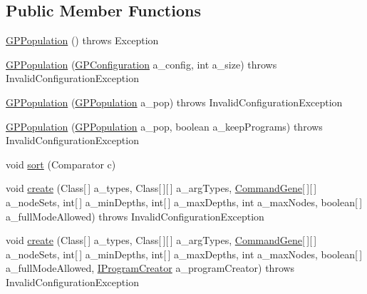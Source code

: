 \subsection*{Public Member Functions}
\begin{DoxyCompactItemize}
\item 
\hyperlink{classorg_1_1jgap_1_1gp_1_1impl_1_1_g_p_population_a2495394d8ede9583b5ac922b8149e37b}{G\-P\-Population} ()  throws Exception 
\item 
\hyperlink{classorg_1_1jgap_1_1gp_1_1impl_1_1_g_p_population_ad19b2b5571851230b86e6f1f0f74fe0b}{G\-P\-Population} (\hyperlink{classorg_1_1jgap_1_1gp_1_1impl_1_1_g_p_configuration}{G\-P\-Configuration} a\-\_\-config, int a\-\_\-size)  throws Invalid\-Configuration\-Exception 
\item 
\hyperlink{classorg_1_1jgap_1_1gp_1_1impl_1_1_g_p_population_a69cc3bdcc9e18685c208485f0c3d0a52}{G\-P\-Population} (\hyperlink{classorg_1_1jgap_1_1gp_1_1impl_1_1_g_p_population}{G\-P\-Population} a\-\_\-pop)  throws Invalid\-Configuration\-Exception 
\item 
\hyperlink{classorg_1_1jgap_1_1gp_1_1impl_1_1_g_p_population_a4dd4478edeca976efc6f31bcdafa19f0}{G\-P\-Population} (\hyperlink{classorg_1_1jgap_1_1gp_1_1impl_1_1_g_p_population}{G\-P\-Population} a\-\_\-pop, boolean a\-\_\-keep\-Programs)  throws Invalid\-Configuration\-Exception 
\item 
void \hyperlink{classorg_1_1jgap_1_1gp_1_1impl_1_1_g_p_population_a9d49b2b18535658aae05ecdc2263918b}{sort} (Comparator c)
\item 
void \hyperlink{classorg_1_1jgap_1_1gp_1_1impl_1_1_g_p_population_aeffef58a29ebb252060a7e2ed91227e2}{create} (Class\mbox{[}$\,$\mbox{]} a\-\_\-types, Class\mbox{[}$\,$\mbox{]}\mbox{[}$\,$\mbox{]} a\-\_\-arg\-Types, \hyperlink{classorg_1_1jgap_1_1gp_1_1_command_gene}{Command\-Gene}\mbox{[}$\,$\mbox{]}\mbox{[}$\,$\mbox{]} a\-\_\-node\-Sets, int\mbox{[}$\,$\mbox{]} a\-\_\-min\-Depths, int\mbox{[}$\,$\mbox{]} a\-\_\-max\-Depths, int a\-\_\-max\-Nodes, boolean\mbox{[}$\,$\mbox{]} a\-\_\-full\-Mode\-Allowed)  throws Invalid\-Configuration\-Exception 
\item 
void \hyperlink{classorg_1_1jgap_1_1gp_1_1impl_1_1_g_p_population_a0f3f874207800be662835fcbc58092cf}{create} (Class\mbox{[}$\,$\mbox{]} a\-\_\-types, Class\mbox{[}$\,$\mbox{]}\mbox{[}$\,$\mbox{]} a\-\_\-arg\-Types, \hyperlink{classorg_1_1jgap_1_1gp_1_1_command_gene}{Command\-Gene}\mbox{[}$\,$\mbox{]}\mbox{[}$\,$\mbox{]} a\-\_\-node\-Sets, int\mbox{[}$\,$\mbox{]} a\-\_\-min\-Depths, int\mbox{[}$\,$\mbox{]} a\-\_\-max\-Depths, int a\-\_\-max\-Nodes, boolean\mbox{[}$\,$\mbox{]} a\-\_\-full\-Mode\-Allowed, \hyperlink{interfaceorg_1_1jgap_1_1gp_1_1_i_program_creator}{I\-Program\-Creator} a\-\_\-program\-Creator)  throws Invalid\-Configuration\-Exception 

\end{DoxyCompactItemize}

